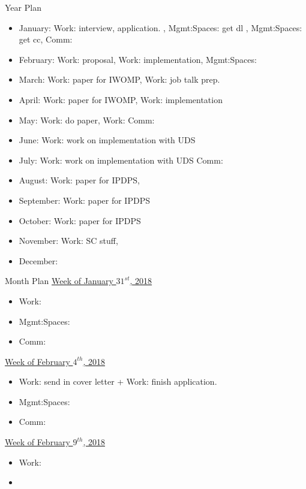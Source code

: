 \begin{columns}
\begin{column}{0.10\linewidth}
\begin{block}{Year Plan}
\begin{itemize}
\tiny \item \tiny January: Work: interview, application. , Mgmt:Spaces: get dl , Mgmt:Spaces: get cc, Comm: 
\item \tiny February: Work: proposal, Work: implementation, Mgmt:Spaces: 
\item \tiny March: Work: paper for IWOMP, Work: job talk prep.
\item \tiny April: Work: paper for IWOMP, Work: implementation  
\item \tiny May: Work: do paper, Work: Comm: 
\item \tiny June: Work: work on implementation with UDS 
\item \tiny July: Work: work on implementation with UDS Comm:  
\item \tiny August: Work: paper for IPDPS, 
\item \tiny September: Work: paper for IPDPS 
\item \tiny October: Work: paper for IPDPS  
\item \tiny November: Work: SC stuff, 
\item \tiny December: 
\end{itemize} 
\end{block}

\begin{block}{Month Plan}
\underline{Week of January $31^{st}$, 2018}
\begin{itemize}
\tiny \item \tiny Work: 
\item \tiny Mgmt:Spaces: 
\item \tiny Comm: 
\end{itemize}

\underline{Week of February $4^{th}$, 2018}
\begin{itemize}
\tiny \item \tiny Work: send in cover letter + Work: finish application.  
\item \tiny Mgmt:Spaces: 
\item \tiny Comm: 
\end{itemize}

\underline{Week of February $9^{th}$, 2018}
\begin{itemize}
\tiny \item \tiny Work: 
\item \tiny
\end{itemize}


\end{block}
\end{column}
\end{columns}
